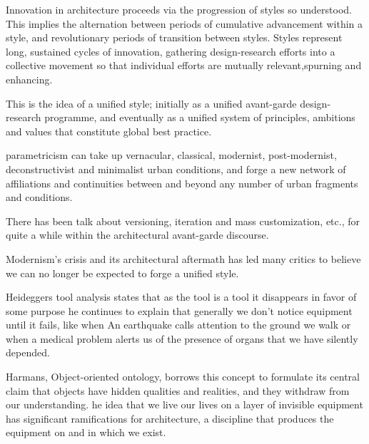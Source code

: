 
Innovation in architecture proceeds via the progression of styles so understood.
This implies the alternation between periods of cumulative advancement within a style, and revolutionary periods of transition between styles.
Styles represent long, sustained cycles of innovation, gathering design-research efforts into a collective movement so that individual efforts are mutually relevant,spurning and enhancing.\cite{Schumacher2010}

This is the idea of a unified style;
initially as a unified avant-garde design-research programme, and eventually as a unified system of principles, ambitions and values that constitute global best practice.\cite{Schumacher2010}


parametricism can take up vernacular, classical, modernist, post-modernist, deconstructivist and minimalist urban conditions, and forge a new network of affiliations and continuities between and beyond any number of urban fragments and conditions. \cite{Schumacher2010}


There has been talk about versioning, iteration and mass customization, etc., for quite a while within the architectural avant-garde discourse. \cite{Schumacher2008}

Modernism’s crisis and its architectural aftermath has led many critics to believe we can no longer be expected to forge a unified style.\cite{Schumacher2010}

Heideggers tool analysis states that as the tool is a tool it disappears in favor of some purpose he continues to explain that generally we don't notice equipment until it fails, like when An earthquake calls attention to the ground we walk or when a medical problem alerts us of the presence of organs that we have silently depended\cite{Harman2011}.

Harmans, Object-oriented ontology, borrows this concept to formulate its central claim that objects have hidden qualities and realities, and they withdraw from our understanding.\cite{Gage2015}
he idea that we live our lives on a layer of invisible equipment has significant ramifications for architecture, a discipline that produces the equipment on and in which we exist.\cite{Gage2015}

